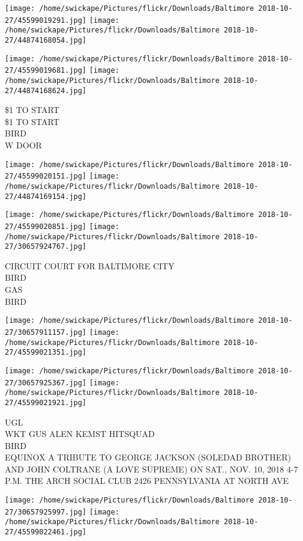 \documentclass[10pt,letterpaper]{article}
\begin{document}
\texttt{[image: /home/swickape/Pictures/flickr/Downloads/Baltimore 2018-10-27/45599019291.jpg]}
\texttt{[image: /home/swickape/Pictures/flickr/Downloads/Baltimore 2018-10-27/44874168054.jpg]}

\texttt{[image: /home/swickape/Pictures/flickr/Downloads/Baltimore 2018-10-27/45599019681.jpg]}
\texttt{[image: /home/swickape/Pictures/flickr/Downloads/Baltimore 2018-10-27/44874168624.jpg]}

\$1 TO START\\
\$1 TO START\\
BIRD\\
W DOOR\\
\pagebreak

\texttt{[image: /home/swickape/Pictures/flickr/Downloads/Baltimore 2018-10-27/45599020151.jpg]}
\texttt{[image: /home/swickape/Pictures/flickr/Downloads/Baltimore 2018-10-27/44874169154.jpg]}

\texttt{[image: /home/swickape/Pictures/flickr/Downloads/Baltimore 2018-10-27/45599020851.jpg]}
\texttt{[image: /home/swickape/Pictures/flickr/Downloads/Baltimore 2018-10-27/30657924767.jpg]}

CIRCUIT COURT FOR BALTIMORE CITY\\
BIRD\\
GAS\\
BIRD\\
\pagebreak

\texttt{[image: /home/swickape/Pictures/flickr/Downloads/Baltimore 2018-10-27/30657911157.jpg]}
\texttt{[image: /home/swickape/Pictures/flickr/Downloads/Baltimore 2018-10-27/45599021351.jpg]}

\texttt{[image: /home/swickape/Pictures/flickr/Downloads/Baltimore 2018-10-27/30657925367.jpg]}
\texttt{[image: /home/swickape/Pictures/flickr/Downloads/Baltimore 2018-10-27/45599021921.jpg]}

UGL\\
WKT GUS ALEN KEMST HITSQUAD\\
BIRD\\
EQUINOX A TRIBUTE TO GEORGE JACKSON (SOLEDAD BROTHER) AND JOHN COLTRANE (A LOVE SUPREME) ON SAT., NOV. 10, 2018 4{-}7 P.M. THE ARCH SOCIAL CLUB 2426 PENNSYLVANIA AT NORTH AVE\\
\pagebreak

\texttt{[image: /home/swickape/Pictures/flickr/Downloads/Baltimore 2018-10-27/30657925997.jpg]}
\texttt{[image: /home/swickape/Pictures/flickr/Downloads/Baltimore 2018-10-27/45599022461.jpg]}
\end{document}
